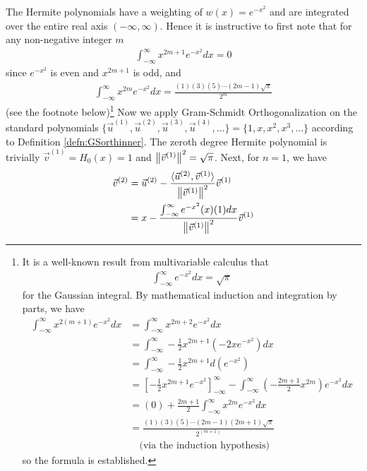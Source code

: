 \begin{solution}
The Hermite polynomials have a weighting of $w(x) = e^{-x^2}$ and are integrated over the entire real axis $(-\infty, \infty)$. Hence it is instructive to first note that for any non-negative integer $m$
\begin{align*}
\int_{-\infty}^{\infty} x^{2m+1}e^{-x^2} dx = 0
\end{align*}
since $e^{-x^2}$ is even and $x^{2m+1}$ is odd, and
\begin{align*}
\int_{-\infty}^{\infty} x^{2m}e^{-x^2} dx = \frac{(1)(3)(5)\cdots(2m-1)\sqrt{\pi}}{2^m}
\end{align*}
(see the footnote below)\footnote{It is a well-known result from multivariable calculus that
\begin{align*}
\int_{-\infty}^{\infty} e^{-x^2} dx = \sqrt{\pi}
\end{align*}
for the Gaussian integral. By mathematical induction and integration by parts, we have
\begin{align*}
\int_{-\infty}^{\infty} x^{2(m+1)}e^{-x^2} dx &= \int_{-\infty}^{\infty} x^{2m+2}e^{-x^2} dx \\
&= \int_{-\infty}^{\infty} -\frac{1}{2}x^{2m+1} (-2xe^{-x^2}) dx \\
&= \int_{-\infty}^{\infty} -\frac{1}{2}x^{2m+1} d(e^{-x^2}) \\
&= [-\frac{1}{2}x^{2m+1}e^{-x^2}]_{-\infty}^{\infty} - \int_{-\infty}^{\infty} (-\frac{2m+1}{2}x^{2m})e^{-x^2} dx \\
&= (0) + \frac{2m+1}{2} \int_{-\infty}^{\infty} x^{2m}e^{-x^2} dx \\
&= \frac{(1)(3)(5)\cdots(2m-1)(2m+1)\sqrt{\pi}}{2^(m+1)} \\
&\quad \text{(via the induction hypothesis)}
\end{align*}
so the formula is established.}
Now we apply Gram-Schmidt Orthogonalization on the standard polynomials $\{\vec{u}^{(1)}, \vec{u}^{(2)}, \vec{u}^{(3)}, \vec{u}^{(4)}, \ldots\} = \{1, x, x^2, x^3, \ldots\}$ according to Definition \ref{defn:GSorthinner}. The zeroth degree Hermite polynomial is trivially $\vec{v}^{(1)} = H_0(x) = 1$ and $\norm{\vec{v}^{(1)}}^2 = \sqrt{\pi}$. Next, for $n=1$, we have
\begin{align*}
\vec{v}^{(2)} &= \vec{u}^{(2)} - \frac{\langle \vec{u}^{(2)}, \vec{v}^{(1)}\rangle}{\norm{\vec{v}^{(1)}}^2} \vec{v}^{(1)} \\
&= x - \frac{\int_{-\infty}^{\infty} e^{-x^2}(x)(1) dx}{\norm{\vec{v}^{(1)}}^2} \vec{v}^{(1)} \\

\end{align*}
\end{solution}
